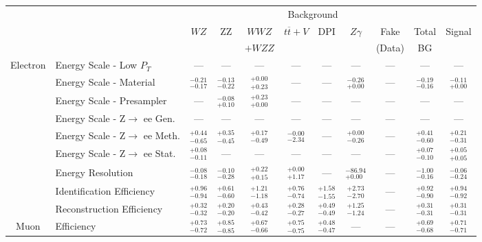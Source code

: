 \small\renewcommand{\tabcolsep}{1pt}
\begin{tabular}{|cl||ccccccc|c||c|}
\hline
 & & \multicolumn{8}{c||}{Background} & \\ 
 & & $WZ$ & ZZ & $WWZ$ & $t\overline{t}+V$ & DPI & $Z\gamma$ & Fake & Total & Signal\\ 
 & & &  & $+WZZ$ &  &  &  & (Data) & BG & \\ 
\hline\hline
\multirow{9}{*}{Electron}
&Energy Scale - Low $P_{T}$ & --- & --- & --- & --- & --- & --- & --- & --- & ---\\ 
\cline{2-11}
&Energy Scale - Material &  $^{-0.21}_{-0.17}$  &  $^{-0.13}_{-0.22}$  &  $^{+0.00}_{+0.23}$  & --- & --- &  $^{-0.26}_{+0.00}$  & --- &  $^{-0.19}_{-0.16}$  &  $^{-0.11}_{+0.00}$ \\ 
\cline{2-11}
&Energy Scale - Presampler & --- &  $^{-0.08}_{+0.10}$  &  $^{+0.23}_{+0.00}$  & --- & --- & --- & --- & --- & ---\\ 
\cline{2-11}
&Energy Scale - Z$\rightarrow$ ee Gen. & --- & --- & --- & --- & --- & --- & --- & --- & ---\\ 
\cline{2-11}
&Energy Scale - Z$\rightarrow$ ee Meth. &  $^{+0.44}_{-0.65}$  &  $^{+0.35}_{-0.45}$  &  $^{+0.17}_{-0.49}$  &  $^{-0.00}_{-2.34}$  & --- &  $^{+0.00}_{-0.26}$  & --- &  $^{+0.41}_{-0.60}$  &  $^{+0.21}_{-0.31}$ \\ 
\cline{2-11}
&Energy Scale - Z$\rightarrow$ ee Stat. &  $^{+0.08}_{-0.11}$  & --- & --- & --- & --- & --- & --- &  $^{+0.07}_{-0.10}$  &  $^{+0.05}_{+0.05}$ \\ 
\cline{2-11}
&Energy Resolution &  $^{-0.08}_{-0.18}$  &  $^{-0.10}_{-0.28}$  &  $^{+0.22}_{+0.15}$  &  $^{+0.00}_{+1.17}$  & --- &  $^{-86.94}_{+0.00}$  & --- &  $^{-1.00}_{-0.16}$  &  $^{-0.06}_{-0.24}$ \\ 
\cline{2-11}
&Identification Efficiency &  $^{+0.96}_{-0.94}$  &  $^{+0.61}_{-0.60}$  &  $^{+1.21}_{-1.18}$  &  $^{+0.76}_{-0.74}$  &  $^{+1.58}_{-1.55}$  &  $^{+2.73}_{-2.70}$  & --- &  $^{+0.92}_{-0.90}$  &  $^{+0.94}_{-0.92}$ \\ 
\cline{2-11}
&Reconstruction Efficiency &  $^{+0.32}_{-0.32}$  &  $^{+0.20}_{-0.20}$  &  $^{+0.43}_{-0.42}$  &  $^{+0.28}_{-0.27}$  &  $^{+0.49}_{-0.49}$  &  $^{+1.25}_{-1.24}$  & --- &  $^{+0.31}_{-0.31}$  &  $^{+0.31}_{-0.31}$ \\ 
\hline
\multirow{4}{*}{Muon}
&Efficiency &  $^{+0.73}_{-0.72}$  &  $^{+0.85}_{-0.85}$  &  $^{+0.67}_{-0.66}$  &  $^{+0.75}_{-0.75}$  &  $^{+0.48}_{-0.47}$  & --- & --- &  $^{+0.69}_{-0.68}$  &  $^{+0.71}_{-0.71}$ \\ 

\end{tabular}
